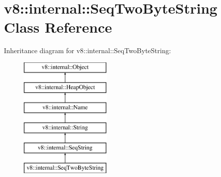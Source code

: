 \hypertarget{classv8_1_1internal_1_1_seq_two_byte_string}{}\section{v8\+:\+:internal\+:\+:Seq\+Two\+Byte\+String Class Reference}
\label{classv8_1_1internal_1_1_seq_two_byte_string}
Inheritance diagram for v8\+:\+:internal\+:\+:Seq\+Two\+Byte\+String\+:\begin{figure}[H]
\begin{center}
\leavevmode
\includegraphics[height=6.000000cm]{classv8_1_1internal_1_1_seq_two_byte_string}
\end{center}
\end{figure}
